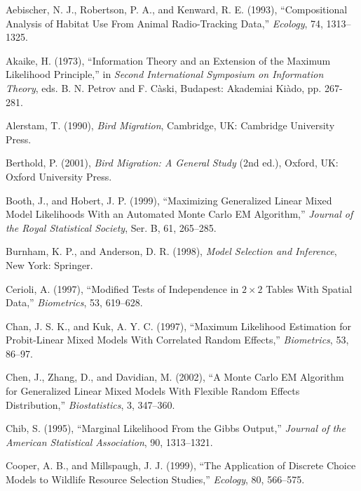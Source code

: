 \documentclass[11pt]{asaproc}
\begin{document}
\begin{references}
\itemsep=0pt
{\footnotesize
\item 
Aebischer, N. J., Robertson, P. A., and Kenward, R. E. (1993), ``Compositional Analysis of Habitat Use From Animal Radio-Tracking Data,'' {\it Ecology}, 74, 1313--1325.

\item 
Akaike, H. (1973), ``Information Theory and an Extension of the Maximum Likelihood Principle,'' in {\it Second International Symposium on Information Theory}, eds. B. N. Petrov and F. C{\` a}ski, Budapest: Akademiai Ki{\` a}do, pp. 267-281.

\item 
Alerstam, T. (1990), {\it Bird Migration}, Cambridge, UK: Cambridge University Press.

\item 
Berthold, P. (2001), {\it Bird Migration: A General Study} (2nd ed.), Oxford, UK: Oxford University Press.

\item 
Booth, J., and Hobert, J. P. (1999), ``Maximizing Generalized Linear Mixed Model Likelihoods With an Automated Monte Carlo EM Algorithm,'' {\it Journal of the Royal Statistical Society}, Ser. B, 61, 265--285.

\item 
Burnham, K. P., and Anderson, D. R. (1998), {\it Model Selection and Inference}, New York: Springer.

\item 
Cerioli, A. (1997), ``Modified Tests of Independence in $2 \times 2$ Tables With Spatial Data,'' {\it Biometrics}, 53, 619--628.

\item
Chan, J. S. K., and Kuk, A. Y. C. (1997), ``Maximum Likelihood Estimation for Probit-Linear Mixed Models With Correlated Random Effects,'' {\it Biometrics}, 53, 86--97. 

\item
Chen, J., Zhang, D., and Davidian, M. (2002), ``A Monte Carlo EM Algorithm for Generalized Linear Mixed Models With Flexible Random Effects Distribution,'' {\it Biostatistics}, 3, 347--360.

\item
Chib, S. (1995), ``Marginal Likelihood From the Gibbs Output,'' {\it Journal of the American Statistical Association}, 90, 1313--1321.

\item
Cooper, A. B., and Millspaugh, J. J. (1999), ``The Application of Discrete Choice Models to Wildlife Resource Selection Studies,'' {\it Ecology}, 80, 
566--575.

}
\end{references}
\end{document}
